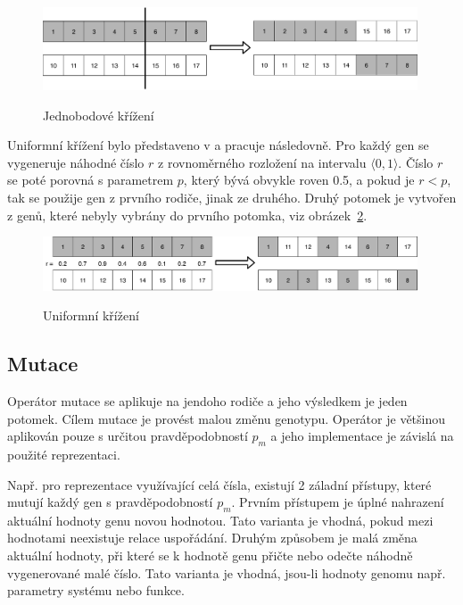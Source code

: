 \begin{figure}[h]
    \centering
    {\includegraphics[width=30em]{obrazky/jedobodove_krizeni.pdf}}
    \caption{
    Jednobodové křížení
    }
    \label{fig:jednobodove_krizeni}
\end{figure}

Uniformní křížení bylo představeno v  a pracuje následovně.
Pro každý gen se vygeneruje náhodné číslo $r$ z rovnoměrného rozložení na intervalu $\langle 0, 1\rangle$.
Číslo $r$ se poté porovná s parametrem $p$, který bývá obvykle roven 0.5, a pokud je $r < p$, tak se použije gen z prvního rodiče, jinak ze druhého.
Druhý potomek je vytvořen z genů, které nebyly vybrány do prvního potomka, viz obrázek~\ref{fig:uniformni_krizeni}.

\begin{figure}[h]
    \centering
    {\includegraphics[width=30em]{obrazky/uniformni_krizeni.pdf}}
    \caption{
    Uniformní křížení
    }
    \label{fig:uniformni_krizeni}
\end{figure}


\subsection{Mutace}
Operátor mutace se aplikuje na jendoho rodiče a jeho výsledkem je jeden potomek.
Cílem mutace je provést malou změnu genotypu.
Operátor je většinou aplikován pouze s určitou pravděpodobností $p_m$ a jeho implementace je závislá na použité reprezentaci.


Např. pro reprezentace využívající celá čísla, existují 2 záladní přístupy, které mutují každý gen s pravděpodobností $p_m$.
Prvním přístupem je úplné nahrazení aktuální hodnoty genu novou hodnotou.
Tato varianta je vhodná, pokud mezi hodnotami neexistuje relace uspořádání.
Druhým způsobem je malá změna aktuální hodnoty, při které se k hodnotě genu přičte nebo odečte náhodně vygenerované malé číslo.
Tato varianta je vhodná, jsou-li hodnoty genomu např. parametry systému nebo funkce.

